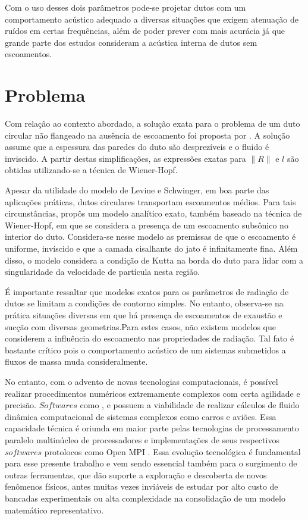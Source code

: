 Com o uso desses dois parâmetros pode-se projetar dutos com um comportamento acústico adequado a diversas situações que exigem atenuação de ruídos em certas frequências, além de poder prever com mais acurácia já que grande parte dos estudos consideram a acústica interna de dutos sem escoamentos.

\section{Problema}

Com relação ao contexto abordado, a solução exata para o problema de um duto circular não flangeado na ausência de escoamento foi proposta por . A solução assume que a espessura das paredes do duto são desprezíveis e o fluido é inviscido. A partir destas simplificações, as expressões exatas para $\|R\|$ e $l$ são obtidas utilizando-se a técnica de Wiener-Hopf.

Apesar da utilidade do modelo de Levine e Schwinger, em boa parte das aplicações práticas, dutos circulares transportam escoamentos médios. Para tais circunstâncias,  propôs um modelo analítico exato, também baseado na técnica de Wiener-Hopf, em que se considera a presença de um escoamento subsônico no interior do duto. Considera-se nesse modelo as premissas de que o escoamento é uniforme, invíscido e que a camada cisalhante do jato é infinitamente fina. Além disso, o modelo considera a condição de Kutta na borda do duto para lidar com a singularidade da velocidade de partícula nesta região.

É importante ressaltar que modelos exatos para os parâmetros de radiação de dutos se limitam a condições de contorno simples. No entanto, observa-se na prática situações diversas em que há presença de escoamentos de exaustão e sucção com diversas geometrias.Para estes casos, não existem modelos que considerem a influência do escoamento nas propriedades de radiação. Tal fato é bastante crítico pois o comportamento acústico de um sistemas submetidos a fluxos de massa muda consideralmente.

No entanto, com o advento de novas tecnologias computacionais, é possível realizar procedimentos numéricos extremamente complexos com certa agilidade e precisão. $Softwares$ como ,  e  possuem a viabilidade de realizar cálculos de fluido dinâmica computacional de sistemas complexos como carros e aviões. Essa capacidade técnica é oriunda em maior parte pelas tecnologias de processamento paralelo multinúcleo de processadores e implementações de seus respectivos $softwares$ protolocos como Open MPI . Essa evolução tecnológica é fundamental para esse presente trabalho e vem sendo essencial também para o surgimento de outras ferramentas, que dão suporte a exploração e descoberta de novos fenômenos físicos, antes muitas vezes inviáveis de estudar por alto custo de bancadas experimentais ou alta complexidade na consolidação de um modelo matemático representativo. 



